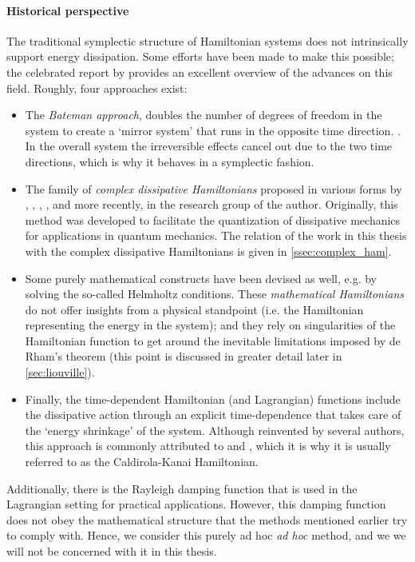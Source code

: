 \paragraph{Historical perspective} The traditional symplectic structure of Hamiltonian systems does not intrinsically support energy dissipation. Some efforts have been made to make this possible; the celebrated report by \citet{Dekker1981} provides an excellent overview of the advances on this field. Roughly, four approaches exist:
\begin{itemize}
    \item The \emph{Bateman approach}, doubles the number of degrees of freedom in the system to create a `mirror system' that runs in the opposite time direction. \cite{Bateman1931}. In the overall system the irreversible effects cancel out due to the two time directions, which is why it behaves in a symplectic fashion.
    \item The family of \emph{complex dissipative Hamiltonians} proposed in various forms by \citet{Bopp1974}, \citet{Dekker1975}, \citet{Dedene1980}, \citet{Rajeev2007}, and more recently, \citet{Hutters2020} in the research group of the author. Originally, this method was developed to facilitate the quantization of dissipative mechanics for applications in quantum mechanics. The relation of the work in this thesis with the complex dissipative Hamiltonians is given in \cref{ssec:complex_ham}.
    \item Some purely mathematical constructs have been devised as well, e.g. by \citet{Havas1957} solving the so-called Helmholtz conditions. These \emph{mathematical Hamiltonians} do not offer insights from a physical standpoint (i.e. the Hamiltonian representing the energy in the system); and they rely on singularities of the Hamiltonian function to get around the inevitable limitations imposed by de Rham's theorem (this point is discussed in greater detail later in \cref{sec:liouville}).
    \item Finally, the time-dependent Hamiltonian (and Lagrangian) functions include the dissipative action through an explicit time-dependence that takes care of the `energy shrinkage' of the system. Although reinvented by several authors, this approach is commonly attributed to \citet{Caldirola1941} and \citet{Kanai1948}, which it is why it is usually referred to as the Caldirola-Kanai Hamiltonian.
\end{itemize}
Additionally, there is the Rayleigh damping function that is used in the Lagrangian setting for practical applications. However, this damping function does not obey the mathematical structure that the methods mentioned earlier try to comply with. Hence, we consider this purely ad hoc \emph{ad hoc} method, and we we will not be concerned with it in this thesis. \cite{Goldstein2011}

